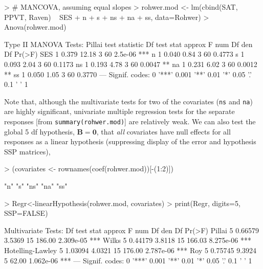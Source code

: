 \documentclass[11pt]{article}
\newcommand{\mat}[1]{\ensuremath{\bm{#1}}}
\newcommand{\code}[1]{{\texttt{#1}}}
\begin{document}
\begin{Schunk}
\begin{Sinput}
> # MANCOVA, assuming equal slopes
> rohwer.mod <- lm(cbind(SAT, PPVT, Raven) ~ SES + n + s + ns + na + ss, 
                   data=Rohwer)
> Anova(rohwer.mod)
\end{Sinput}
\begin{Soutput}
Type II MANOVA Tests: Pillai test statistic
    Df test stat approx F num Df den Df  Pr(>F)    
SES  1     0.379    12.18      3     60 2.5e-06 ***
n    1     0.040     0.84      3     60  0.4773    
s    1     0.093     2.04      3     60  0.1173    
ns   1     0.193     4.78      3     60  0.0047 ** 
na   1     0.231     6.02      3     60  0.0012 ** 
ss   1     0.050     1.05      3     60  0.3770    
---
Signif. codes:  0 '***' 0.001 '**' 0.01 '*' 0.05 '.' 0.1 ' ' 1 
\end{Soutput}
\end{Schunk}

Note that, although the
multivariate tests for two of the covariates (\texttt{ns} and \texttt{na})
are highly significant, univariate multiple regression tests for the
separate responses [from \code{summary(rohwer.mod)}] are relatively weak.
We can also test the global 5 df hypothesis, $\mat{B}=\mat{0}$, 
that \emph{all} covariates have null effects
for all responses as a linear hypothesis (suppressing display of the error
and hypothesis SSP matrices),

\begin{Schunk}
\begin{Sinput}
> (covariates <- rownames(coef(rohwer.mod))[-(1:2)])
\end{Sinput}
\begin{Soutput}
[1] "n"  "s"  "ns" "na" "ss"
\end{Soutput}
\begin{Sinput}
> Regr<-linearHypothesis(rohwer.mod, covariates)
> print(Regr, digits=5, SSP=FALSE)
\end{Sinput}
\begin{Soutput}
Multivariate Tests: 
                 Df test stat approx F num Df den Df    Pr(>F)    
Pillai            5   0.66579   3.5369     15 186.00 2.309e-05 ***
Wilks             5   0.44179   3.8118     15 166.03 8.275e-06 ***
Hotelling-Lawley  5   1.03094   4.0321     15 176.00 2.787e-06 ***
Roy               5   0.75745   9.3924      5  62.00 1.062e-06 ***
---
Signif. codes:  0 '***' 0.001 '**' 0.01 '*' 0.05 '.' 0.1 ' ' 1 
\end{Soutput}
\end{Schunk}
\end{document}
